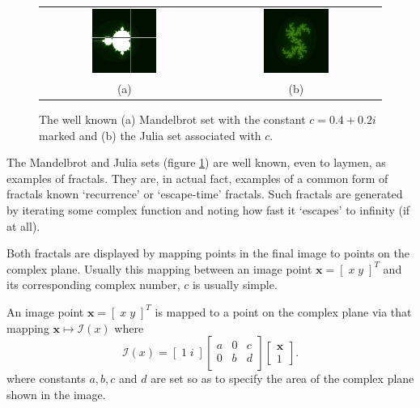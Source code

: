 \begin{figure}
\centering
\begin{tabular}{c@{$\quad$}c}
\includegraphics[width=0.4\textwidth]{euc_mandel_julia_pos} 
 & \includegraphics[width=0.4\textwidth]{julia_euc} \\
                          (a) & (b)
\end{tabular}
\caption{\label{fig:euclidean_sets}The well known (a) Mandelbrot set with
  the constant $c = 0.4 + 0.2i$ marked and (b) the Julia
  set associated with $c$.}
\end{figure}

The Mandelbrot and Julia sets (figure \ref{fig:euclidean_sets}) are well known, even to
laymen, as examples of fractals. They are, in actual fact, examples of a 
common form of fractals known `recurrence' or `escape-time' fractals.
Such fractals are generated by iterating some complex function and noting
how fast it `escapes' to infinity (if at all).

Both fractals are displayed by mapping points in the final image to points on the
complex plane. Usually this mapping between an image point $\mathbf{x} = [\; x\;y \;]^T$ and
its corresponding complex number, $c$ is usually simple.

\begin{definition}
An image point $\mathbf{x} = [\; x\;y \;]^T$ is mapped to a point on the 
complex plane via that mapping $\mathbf{x} \mapsto {\mathcal I}(x)$ where
\[
{\mathcal I}(x) = [\; 1 \; i \;] \left[ 
  \begin{array}{ccc}
a & 0 & c \\
0 & b & d \\
  \end{array}
\right]
\left[
  \begin{array}{c}
  \mathbf{x} \\ 1
  \end{array}
\right].
\]
where constants $a,b,c$ and $d$ are set so as to specify the area of the complex 
plane shown in the image.
\end{definition}

